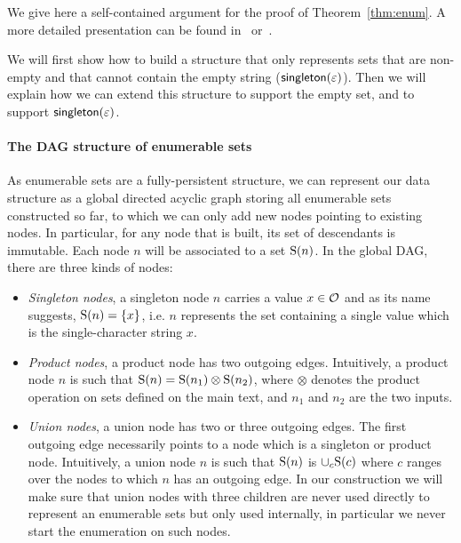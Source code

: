 %
%
%
%
%
%
%

%
%

%
%
%
%
%
%


%
%
%

%
%
%
%
%
%

We give here a self-contained argument for the proof of
Theorem~\ref{thm:enum}. A more detailed presentation can be found
in~\cite{amarilli2017circuit} or~\cite{icdt2020nested}.

We will first show how to build a structure that only represents
sets that are non-empty and that cannot contain the empty string
($\textsf{singleton}(\varepsilon)$). Then we will explain how we can
extend this structure to support the empty set, and to support
$\textsf{singleton}(\varepsilon)$.

\paragraph{The DAG structure of enumerable sets}
As enumerable sets are a fully-persistent structure, we can represent
our data structure as a global directed acyclic graph storing all
enumerable sets constructed so far, to which we can only add new nodes
pointing to existing nodes. In particular, for any node that is built, its
set of descendants is immutable.
Each node $n$ will be associated to a set
$\mathrm{S}(n)$. 
In the global DAG, there are three 
kinds of nodes:
%
%

\begin{itemize}
  \item \emph{Singleton nodes}, a singleton node $n$ carries a value
  $x \in \mathcal{O}$ and as its name suggests, $\mathrm{S}(n)=\{x\}$, i.e. $n$ represents
  the set containing a single value which is the single-character string $x$.
  
  \item \emph{Product nodes}, a product node has two outgoing
    edges. Intuitively, a product node $n$ is such that $\mathrm{S}(n)
    = \mathrm{S}(n_1) \otimes \mathrm{S}(n_2)$, where $\otimes$ denotes the
    product operation on sets defined on the main text, and $n_1$
    and $n_2$ are the two inputs.
    
    \item \emph{Union nodes}, a union node has two or three outgoing
    edges. The first outgoing edge necessarily points to a node which
    is a singleton or product node. Intuitively, a union node $n$ is
    such that $\mathrm{S}(n)$ is $\cup_{c}\mathrm{S}(c)$ where $c$ ranges over the nodes to
    which $n$ has an outgoing edge.
    In our construction we will make sure that
    union nodes with three children are never used directly to
    represent an enumerable sets but only used internally, in particular we
    never start the enumeration on such nodes.
\end{itemize}




